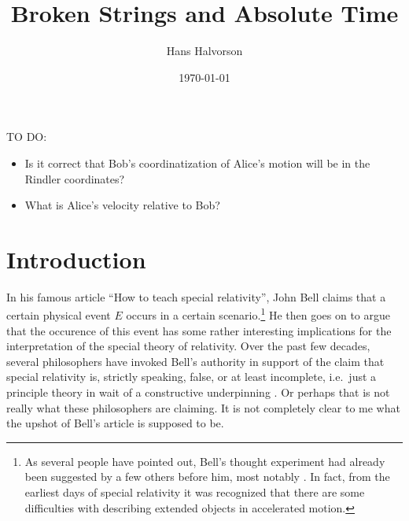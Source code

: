 \documentclass[tikz,border=10pt,fleqn]{article}
\title{Broken Strings and Absolute Time}
\author{Hans Halvorson}
\date{\today}
\theoremstyle{definition}
\begin{document}




\maketitle

TO DO:
\begin{itemize}
\item Is it correct that Bob's coordinatization of Alice's motion will
  be in the Rindler coordinates?
\item What is Alice's velocity relative to Bob?   
\end{itemize}

\section{Introduction}

In his famous article ``How to teach special relativity'', John Bell
\citeyearpar{bell} claims that a certain physical event $E$ occurs in
a certain scenario.\footnote{As several people have pointed out,
  Bell's thought experiment had already been suggested by a few others
  before him, most notably \citet{dewan1959}. In fact, from the
  earliest days of special relativity it was recognized that there are
  some difficulties with describing extended objects in accelerated
  motion.} He then goes on to argue that the occurence of this event
has some rather interesting implications for the interpretation of the
special theory of relativity. Over the past few decades, several
philosophers have invoked Bell's authority in support of the claim
that special relativity is, strictly speaking, false, or at least
incomplete, i.e.\ just a principle theory in wait of a constructive
underpinning \citep[see][]{brown1999,brown2004}. Or perhaps that is
not really what these philosophers are claiming. It is not completely
clear to me what the upshot of Bell's article is supposed to be.
\end{document}
